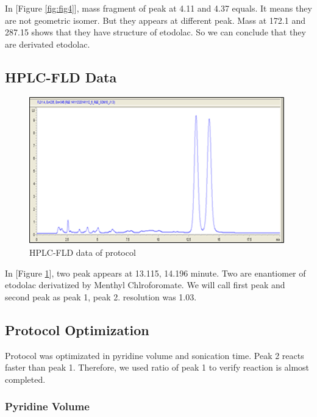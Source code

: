\documentclass[12pt]{article} %
\begin{document}
In [Figure \ref{fig:fig4}], mass fragment of peak at 4.11 and 4.37 equals. It means they are not geometric isomer. But they appears at different peak. Mass at 172.1 and 287.15 shows that they have structure of etodolac.\cite{cite3} So we can conclude that they are derivated etodolac. 


\subsection {HPLC-FLD Data}
\begin{figure}[h!]
  \centering
  \includegraphics[width=\linewidth]{fig5.png}
  \caption{HPLC-FLD data of protocol}
  \label{fig:fig5}
\end{figure}

In [Figure \ref{fig:fig5}], two peak appears at 13.115, 14.196 minute. Two are enantiomer of etodolac derivatized by Menthyl Chlroforomate. We will call first peak and second peak as peak 1, peak 2. resolution was 1.03.

\subsection{ Protocol Optimization }

  Protocol was optimizated in pyridine volume and sonication time. Peak 2 reacts faster than peak 1. Therefore, we used ratio of peak 1 to verify reaction is almost completed.

\subsubsection {Pyridine Volume}
\end{document}
